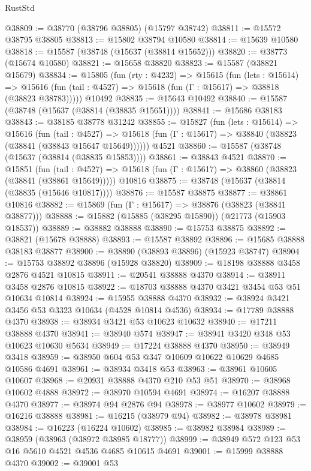 \begin{lexlean}{RustStd}
\begin{coremodule}
@38809 := @38770 (@38796 @38805) (@15797 @38742)
@38811 := @15572 @38795 @38805
@38813 := @15802 @38794 @10580
@38814 := @15639 @10580
@38818 := @15587 (@38748 (@15637 (@38814 @15652)))
@38820 := @38773 (@15674 @10580)
@38821 := @15658 @38820
@38823 := @15587 (@38821 @15679)
@38834 := @15805
    (fun (rty : @4232) =>
    @15615
      (fun (lets : @15614) =>
      @15616 (fun (tail : @4527) => @15618 (fun (Γ : @15617) => @38818 (@38823 @38783)))))
    @10492
@38835 := @15643 @10492
@38840 := @15587 (@38748 (@15637 (@38814 (@38835 @15651))))
@38841 := @15686 @38183
@38843 := @38185 @38778 @31242
@38855 := @15827
    (fun (lets : @15614) =>
    @15616
      (fun (tail : @4527) =>
      @15618 (fun (Γ : @15617) => @38840 (@38823 (@38841 (@38843 @15647 @15649))))))
    @4521
@38860 := @15587 (@38748 (@15637 (@38814 (@38835 @15853))))
@38861 := @38843 @4521
@38870 := @15851
    (fun (tail : @4527) => @15618 (fun (Γ : @15617) => @38860 (@38823 (@38841 (@38861 @15649)))))
    @10816
@38875 := @38748 (@15637 (@38814 (@38835 (@15646 @10817))))
@38876 := @15587 @38875
@38877 := @38861 @10816
@38882 := @15869 (fun (Γ : @15617) => @38876 (@38823 (@38841 @38877)))
@38888 := @15882 (@15885 (@38295 @15890)) (@21773 (@15903 @18537))
@38889 := @38882 @38888
@38890 := @15753 @38875
@38892 := @38821 (@15678 @38888)
@38893 := @15587 @38892
@38896 := @15685 @38888 @38183 @38877
@38900 := @38890 (@38893 @38896) (@15923 @38747)
@38904 := @15753 @38892 @38896 (@15928 @38820)
@38909 := @18198 @38888 @3458 @2876 @4521 @10815
@38911 := @20541 @38888 @4370
@38914 := @38911 @3458 @2876 @10815
@38922 := @18703 @38888 @4370 @3421 @3454 @53 @51 @10634 @10814
@38924 := @15955 @38888 @4370
@38932 := @38924 @3421 @3456 @53 @3323 @10634 (@4528 @10814 @4536)
@38934 := @17789 @38888 @4370
@38938 := @38934 @3421 @53 @10623 @10632
@38940 := @17211 @38888 @4370
@38941 := @38940 @574
@38947 := @38941 @3420 @348 @53 @10623 @10630 @5634
@38949 := @17224 @38888 @4370
@38950 := @38949 @3418
@38959 := @38950 @604 @53 @347 @10609 @10622 @10629 @4685 @10586 @4691
@38961 := @38934 @3418 @53
@38963 := @38961 @10605 @10607
@38968 := @20931 @38888 @4370 @210 @53 @51
@38970 := @38968 @10602 @4888
@38972 := @38970 @10594 @4691
@38974 := @16207 @38888 @4370
@38977 := @38974 @94 @2876 @94
@38978 := @38977 @10602
@38979 := @16216 @38888
@38981 := @16215 (@38979 @94)
@38982 := @38978 @38981
@38984 := @16223 (@16224 @10602)
@38985 := @38982 @38984
@38989 := @38959 (@38963 (@38972 @38985 @18777))
@38999 := @38949 @572 @123 @53 @16 @5610 @4521 @4536 @4685 @10615 @4691
@39001 := @15999 @38888 @4370
@39002 := @39001 @53

\end{coremodule}
\end{lexlean}
